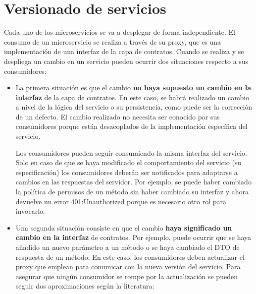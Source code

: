 \documentclass[11pt,spanish,listoffigures]{tfgetsinf}
\begin{document}
\newpage

\section{Versionado de servicios}

Cada uno de los microservicios se va a desplegar de forma independiente. El consumo de un microservicio se realiza a través de su proxy, que es una implementación de una interfaz de la capa de contratos. Cuando se realiza y se despliega un cambio en un servicio pueden ocurrir dos situaciones respecto a sus consumidores:

\begin{itemize}

\item  La primera situación es que el cambio \textbf{no haya supuesto un cambio en la interfaz} de la capa de contratos. En este caso, se habrá realizado un cambio a nivel de la lógica del servicio o su persistencia, como puede ser la corrección de un defecto. El cambio realizado no necesita ser conocido por sus consumidores porque están desacoplados de la implementación específica del servicio. 

Los consumidores pueden seguir consumiendo la misma interfaz del servicio. Solo en caso de que se haya modificado el comportamiento del servicio (su especificación) los consumidores deberán ser notificados para adaptarse a cambios en las respuestas del servidor. Por ejemplo, se puede haber cambiado la política de permisos de un método sin haber cambiado su interfaz y ahora devuelve un error 401:Unauthorized porque es necesario otro rol para invocarlo.

\item Una segunda situación consiste en que el cambio \textbf{haya significado un cambio en la interfaz} de contratos. Por ejemplo, puede ocurrir que se haya añadido un nuevo parámetro a un método o se haya cambiado el DTO de respuesta de un método. En este caso, los consumidores deben actualizar el proxy que emplean para comunicar con la nueva versión del servicio. Para asegurar que ningún consumidor se rompe por la actualización se pueden seguir dos aproximaciones según la literatura:

\begin{itemize}


\end{itemize}
\end{itemize}
\end{document}
